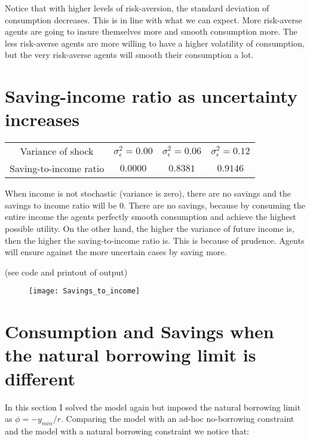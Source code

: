 \documentclass[letter,11pt]{article}
\begin{document}
Notice that with higher levels of risk-aversion, the standard deviation of consumption decreases. This is in line with what we can expect. More risk-averse agents are going to insure themselves more and smooth consumption more. The less risk-averse agents are more willing to have a higher volatility of consumption, but the very risk-averse agents will smooth their consumption a lot. 

 


\section{Saving-income ratio as uncertainty increases}
\hfill

\begin{tabular}{ c  | c | c | c   } \hline
Variance of shock  & $\sigma_{\epsilon}^2=0.00$  & $\sigma_{\epsilon}^2 = 0.06$ & $\sigma_{\epsilon}^2 = 0.12$  \\  
Saving-to-income ratio & $0.0000$ &   $0.8381$ &  $0.9146$ \\ \hline
\end{tabular}

When income is not stochastic (variance is zero), there are no savings and the savings to income ratio will be 0. There are no savings, because by consuming the entire income the agents perfectly smooth consumption and achieve the highest possible utility. On the other hand, the higher the variance of future income is, then the higher the saving-to-income ratio is. This is because of prudence. Agents will ensure against the more uncertain cases by saving more.

(see code and printout of output)

\begin{figure}[h!]
  \centering
        \texttt{[image: Savings\_to\_income]}
  \end{figure}



\clearpage
\section{Consumption and Savings when the natural borrowing limit is different}
\hfill

In this section I  solved the model again but imposed the natural borrowing limit as  
$\phi = -y_{min}/r$. Comparing the model with an ad-hoc no-borrowing constraint and the model with a natural borrowing constraint we notice that:
\end{document}
